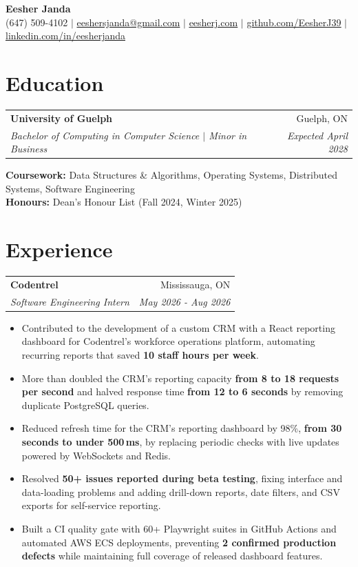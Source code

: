 \documentclass[letterpaper,11pt]{article}
\makeatletter
\newcommand{\resumelink}[2]{\href{#1}{\underline{#2}}}
\newcommand{\resumeSubheading}[4]{%
  \begin{tabular*}{\textwidth}{l@{\extracolsep{\fill}}r}
    \textbf{#1} & \small #2 \\
    \textit{\small #3} & \textit{\small #4} \\
  \end{tabular*}\vspace{0pt}
}
\newenvironment{resumeItems}{%
  \begin{itemize}[leftmargin=0.18in,label=\textbullet,
    itemsep=1pt,topsep=1pt,parsep=0pt,partopsep=0pt]\small
}{\end{itemize}\vspace{0pt}}
\newcommand{\resumeItem}[1]{\item #1}
\makeatother
\begin{document}
\begin{center}
  {\fontsize{25}{28}\selectfont\bfseries Eesher Janda}\\[4pt]
  \small (647) 509-4102 $|$
  \href{mailto:eeshersjanda@gmail.com}{eeshersjanda@gmail.com} $|$
  \resumelink{https://eesherj.com}{eesherj.com} $|$
  \resumelink{https://github.com/EesherJ39}{github.com/EesherJ39} $|$
  \resumelink{https://www.linkedin.com/in/eesherjanda/}{linkedin.com/in/eesherjanda}
\end{center}
\vspace{-7pt}

\section{Education}
\resumeSubheading
  {University of Guelph}{Guelph, ON}
  {Bachelor of Computing in Computer Science $|$ Minor in Business}{Expected April 2028}
{\small
  \textbf{Coursework:} Data Structures \& Algorithms, Operating Systems, Distributed Systems, Software Engineering\\
  \textbf{Honours:} Dean's Honour List (Fall 2024, Winter 2025)\par
}

\section{Experience}
\resumeSubheading
  {Codentrel}{Mississauga, ON}
  {Software Engineering Intern}{May 2026 - Aug 2026}
\begin{resumeItems}
  \resumeItem{Contributed to the development of a custom CRM with a React reporting dashboard for Codentrel's workforce operations platform, automating recurring reports that saved \textbf{10 staf{}f hours per week}.}
  \resumeItem{More than doubled the CRM's reporting capacity \textbf{from 8 to 18 requests per second} and halved response time \textbf{from 12 to 6 seconds} by removing duplicate PostgreSQL queries.}
  \resumeItem{Reduced refresh time for the CRM's reporting dashboard by 98\%, \textbf{from 30 seconds to under 500\,ms}, by replacing periodic checks with live updates powered by WebSockets and Redis.}
  \resumeItem{Resolved \textbf{50+ issues reported during beta testing}, f{}ixing interface and data-loading problems and adding drill-down reports, date f{}ilters, and CSV exports for self-service reporting.}
  \resumeItem{Built a CI quality gate with 60+ Playwright suites in GitHub Actions and automated AWS ECS deployments, preventing \textbf{2 conf{}irmed production defects} while maintaining full coverage of released dashboard features.}
\end{resumeItems}
\end{document}

